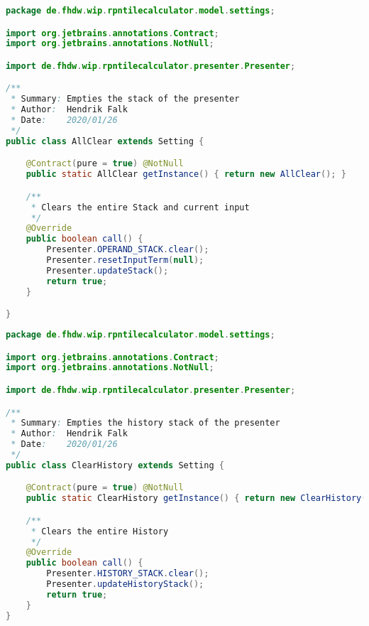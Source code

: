\begin{lstlisting}[caption=AllClear (Falk),label=list:AllClear,language=Java]
package de.fhdw.wip.rpntilecalculator.model.settings;

import org.jetbrains.annotations.Contract;
import org.jetbrains.annotations.NotNull;

import de.fhdw.wip.rpntilecalculator.presenter.Presenter;

/**
 * Summary: Empties the stack of the presenter
 * Author:  Hendrik Falk
 * Date:    2020/01/26
 */
public class AllClear extends Setting {

    @Contract(pure = true) @NotNull
    public static AllClear getInstance() { return new AllClear(); }

    /**
     * Clears the entire Stack and current input
     */
    @Override
    public boolean call() {
        Presenter.OPERAND_STACK.clear();
        Presenter.resetInputTerm(null);
        Presenter.updateStack();
        return true;
    }

}
\end{lstlisting}    

\begin{lstlisting}[caption=ClearHistory (Falk),label=list:ClearHistory,language=Java]
package de.fhdw.wip.rpntilecalculator.model.settings;

import org.jetbrains.annotations.Contract;
import org.jetbrains.annotations.NotNull;

import de.fhdw.wip.rpntilecalculator.presenter.Presenter;

/**
 * Summary: Empties the history stack of the presenter
 * Author:  Hendrik Falk
 * Date:    2020/01/26
 */
public class ClearHistory extends Setting {

    @Contract(pure = true) @NotNull
    public static ClearHistory getInstance() { return new ClearHistory(); }

    /**
     * Clears the entire History
     */
    @Override
    public boolean call() {
        Presenter.HISTORY_STACK.clear();
        Presenter.updateHistoryStack();
        return true;
    }
}

\end{lstlisting}    

